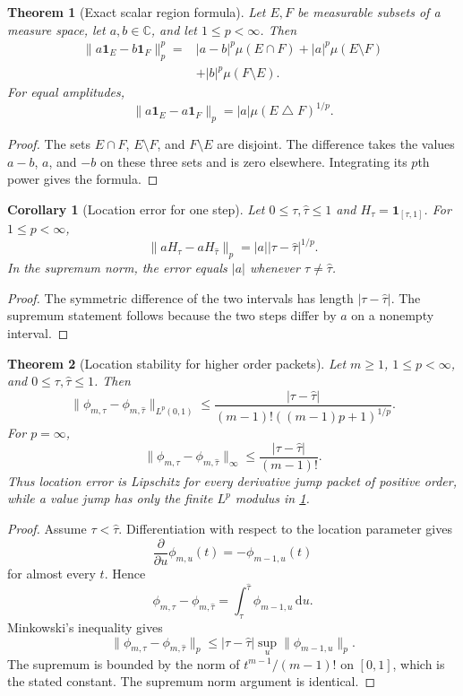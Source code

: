 \documentclass[11pt,letterpaper]{article}
\newtheorem{theorem}{Theorem}[section]
\theoremstyle{plain}
\theoremstyle{plain}
\theoremstyle{plain}
\newtheorem{corollary}[corollary]{Corollary}
\theoremstyle{definition}
\theoremstyle{definition}
\theoremstyle{definition}
\theoremstyle{definition}
\theoremstyle{remark}
\theoremstyle{remark}
\theoremstyle{remark}
\theoremstyle{remark}
\newcommand{\CC}{\mathbb C}
\newcommand{\one}{\mathbf 1}
\newcommand{\dd}{\,\mathrm d}
\let\KomorebiPrimitiveMathbin\mathbin
\renewcommand{\mathbin}[1]{\KomorebiPrimitiveMathbin{#1}}
\let\KomorebiPrimitiveWidehat\widehat
\renewcommand{\widehat}[1]{\KomorebiPrimitiveWidehat{#1}}
\begin{document}
\begin{theorem}[Exact scalar region formula]\label{thm:scalar_region_formula}
Let \(E,F\) be measurable subsets of a measure space, let \(a,b\in\CC\), and let \(1\leq p<\infty\). Then
\[
\begin{aligned}
\|a\one_E-b\one_F\|_p^p
={}&
|a-b|^p\mu(E\cap F)
+|a|^p\mu(E\setminus F)\\
&+|b|^p\mu(F\setminus E).
\end{aligned}
\]
For equal amplitudes,
\[
\|a\one_E-a\one_F\|_p
=
|a|\mu(E\mathbin\triangle F)^{1/p}.
\]
\end{theorem}

\begin{proof}
The sets \(E\cap F\), \(E\setminus F\), and \(F\setminus E\) are disjoint. The difference takes the values \(a-b\), \(a\), and \(-b\) on these three sets and is zero elsewhere. Integrating its \(p\)th power gives the formula.
\end{proof}

\begin{corollary}[Location error for one step]\label{cor:step_location_error}
Let \(0\leq\tau,\widehat\tau\leq1\) and \(H_\tau=\one_{[\tau,1]}\). For \(1\leq p<\infty\),
\[
\|aH_\tau-aH_{\widehat\tau}\|_p
=
|a||\tau-\widehat\tau|^{1/p}.
\]
In the supremum norm, the error equals \(|a|\) whenever \(\tau\neq\widehat\tau\).
\end{corollary}

\begin{proof}
The symmetric difference of the two intervals has length \(|\tau-\widehat\tau|\). The supremum statement follows because the two steps differ by \(a\) on a nonempty interval.
\end{proof}

\begin{theorem}[Location stability for higher order packets]\label{thm:higher_order_location}
Let \(m\geq1\), \(1\leq p<\infty\), and \(0\leq\tau,\widehat\tau\leq1\). Then
\[
\|\phi_{m,\tau}-\phi_{m,\widehat\tau}\|_{L^p(0,1)}
\leq
\frac{|\tau-\widehat\tau|}
{(m-1)!((m-1)p+1)^{1/p}}.
\]
For \(p=\infty\),
\[
\|\phi_{m,\tau}-\phi_{m,\widehat\tau}\|_\infty
\leq
\frac{|\tau-\widehat\tau|}{(m-1)!}.
\]
Thus location error is Lipschitz for every derivative jump packet of positive order, while a value jump has only the finite \(L^p\) modulus in \cref{cor:step_location_error}.
\end{theorem}

\begin{proof}
Assume \(\tau<\widehat\tau\). Differentiation with respect to the location parameter gives
\[
\frac{\partial}{\partial u}\phi_{m,u}(t)
=-\phi_{m-1,u}(t)
\]
for almost every \(t\). Hence
\[
\phi_{m,\tau}-\phi_{m,\widehat\tau}
=
\int_\tau^{\widehat\tau}\phi_{m-1,u}\dd u.
\]
Minkowski's inequality gives
\[
\|\phi_{m,\tau}-\phi_{m,\widehat\tau}\|_p
\leq
|\tau-\widehat\tau|
\sup_u\|\phi_{m-1,u}\|_p.
\]
The supremum is bounded by the norm of \(t^{m-1}/(m-1)!\) on \([0,1]\), which is the stated constant. The supremum norm argument is identical.
\end{proof}
\end{document}
